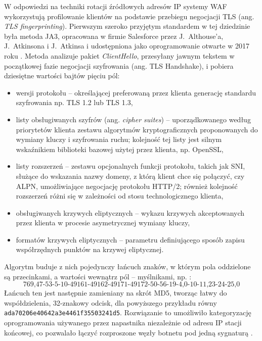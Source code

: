 \documentclass[a4paper,12pt]{article}
\begin{document}
W odpowiedzi na techniki rotacji źródłowych adresów IP systemy WAF wykorzystują profilowanie klientów na podstawie przebiegu negocjacji TLS (ang. \textit{TLS fingerprinting}). Pierwszym szeroko przyjętym standardem w tej dziedzinie była metoda JA3, opracowana w firmie Salesforce przez J.~Althouse'a, J.~Atkinsona i J.~Atkinsa i udostępniona jako oprogramowanie otwarte w 2017 roku \cite{althouse2017ja3}. Metoda analizuje pakiet \textit{ClientHello}, przesyłany jawnym tekstem w początkowej fazie negocjacji szyfrowania (ang. TLS Handshake), i pobiera dziesiętne wartości bajtów pięciu pól:
\begin{itemize}
    \item wersji protokołu – określającej preferowaną przez klienta generację standardu szyfrowania np. TLS 1.2 lub TLS 1.3,
    \item listy obsługiwanych szyfrów (ang. \textit{cipher suites}) – uporządkowanego według priorytetów klienta zestawu algorytmów kryptograficznych proponowanych do wymiany kluczy i szyfrowania ruchu; kolejność tej listy jest silnym wskaźnikiem biblioteki bazowej użytej przez klienta, np. OpenSSL,
    \item listy rozszerzeń – zestawu opcjonalnych funkcji protokołu, takich jak SNI, służące do wskazania nazwy domeny, z którą klient chce się połączyć, czy ALPN, umożliwiające negocjację protokołu HTTP/2; również kolejność rozszerzeń różni się w zależności od stosu technologicznego klienta,
    \item obsługiwanych krzywych eliptycznych – wykazu krzywych akceptowanych przez klienta w procesie asymetrycznej wymiany kluczy,
    \item formatów krzywych eliptycznych – parametru definiującego sposób zapisu współrzędnych punktów na krzywej eliptycznej.
\end{itemize}
Algorytm buduje z nich pojedynczy łańcuch znaków, w którym pola oddzielone są przecinkami, a wartości wewnątrz pól – myślnikami, np. \cite{althouse2017ja3}:
\begin{equation}
    \text{769,47-53-5-10-49161-49162-49171-49172-50-56-19-4,0-10-11,23-24-25,0}
\end{equation}
Łańcuch ten jest następnie zamieniany na skrót MD5, tworząc łatwy do współdzielenia, 32-znakowy odcisk, dla powyższego przykładu równy \texttt{ada70206e40642a3e4461f35503241d5}. Rozwiązanie to umożliwiło kategoryzację oprogramowania używanego przez napastnika niezależnie od adresu IP stacji końcowej, co pozwalało łączyć rozproszone węzły botnetu pod jedną sygnaturą \cite{althouse2017ja3}.
\end{document}
